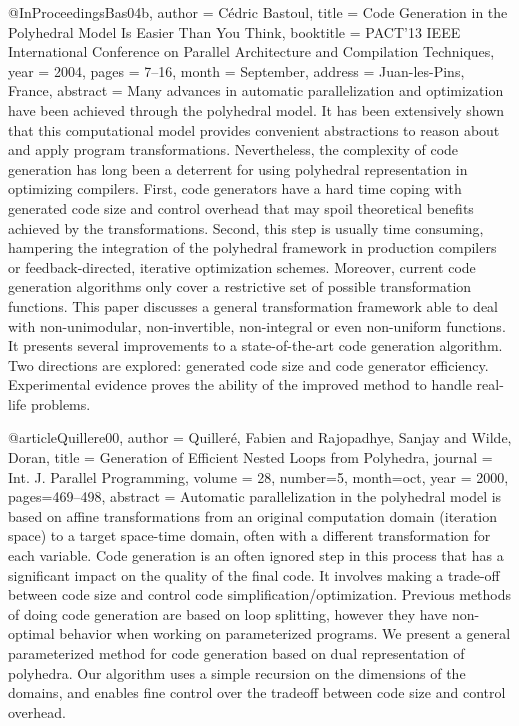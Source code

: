 @InProceedings{Bas04b,
 author = {C\'{e}dric Bastoul},
 title = {Code Generation in the Polyhedral Model Is Easier Than You Think},
 booktitle = {PACT'13 IEEE International Conference on Parallel Architecture
              and Compilation Techniques},
 year =	2004,
 pages = {7--16},
 month = {September},
 address = {Juan-les-Pins, France},
 abstract = {Many advances in automatic parallelization and optimization have been achieved through the polyhedral model. It has been extensively shown that this computational model provides convenient abstractions to reason about and apply program transformations. Nevertheless, the complexity of code generation has long been a deterrent for using polyhedral representation in optimizing compilers. First, code generators have a hard time coping with generated code size and control overhead that may spoil theoretical benefits achieved by the transformations. Second, this step is usually time consuming, hampering the integration of the polyhedral framework in production compilers or feedback-directed, iterative optimization schemes. Moreover, current code generation algorithms only cover a restrictive set of possible transformation functions. This paper discusses a general transformation framework able to deal with non-unimodular, non-invertible, non-integral or even non-uniform functions. It presents several improvements to a state-of-the-art code generation algorithm. Two directions are explored: generated code size and code generator efficiency. Experimental evidence proves the ability of the improved method to handle real-life problems.}
}

@article{Quillere00,
 author = {Quiller\'{e}, Fabien and Rajopadhye, Sanjay and Wilde, Doran},
 title = {Generation of Efficient Nested Loops from Polyhedra},
 journal = {Int. J. Parallel Programming},
 volume = 28,
 number=5,
 month=oct,
 year = 2000,
 pages={469--498},
 abstract = {Automatic parallelization in the polyhedral model is based on affine transformations from an original computation domain (iteration space) to a target space-time domain, often with a different transformation for each variable. Code generation is an often ignored step in this process that has a significant impact on the quality of the final code. It involves making a trade-off between code size and control code simplification/optimization. Previous methods of doing code generation are based on loop splitting, however they have non-optimal behavior when working on parameterized programs. We present a general parameterized method for code generation based on dual representation of polyhedra. Our algorithm uses a simple recursion on the dimensions of the domains, and enables fine control over the tradeoff between code size and control overhead.}
}

